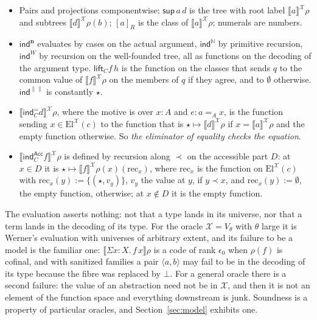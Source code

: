 \documentclass[10pt]{article}
\newcommand{\N}{\mathbb{N}}
\newcommand{\sem}[1]{\llbracket #1\rrbracket}
\newcommand{\El}{\mathrm{El}}
\newcommand{\X}{\mathcal{X}}
\newcommand{\ind}{\mathsf{ind}}
\newcommand{\Acc}{\mathsf{Acc}}
\begin{document}
\begin{definition}[evaluation]
\begin{itemize}
\item Pairs and projections componentwise; $\mathsf{sup}\,a\,d$ is the
  tree with root label $\sem a^\X\rho$ and subtrees $\sem d^\X\rho(b)$;
  $[a]_R$ is the class of $\sem a^\X\rho$; numerals are numbers.
\item $\ind^{\mathbf n}$ evaluates by cases on the actual argument,
  $\ind^\N$ by primitive recursion, $\ind^W$ by recursion on the
  well-founded tree, all as functions on the decoding of the argument
  type. $\mathsf{lift}_Cf\,h$ is the function on the classes that sends
  $q$ to the common value of $\sem f^\X\rho$ on the members of $q$ if
  they agree, and to $\emptyset$ otherwise. $\ind^{\|\|}$ is constantly $\star$.
\item $\sem{\ind^=_Cd}^\X\rho$, where the motive is over $x{:}A$ and
  $e{:}a=_Ax$, is the function sending $x\in\El^\X(c)$ to the function
  that is $\star\mapsto\sem d^\X\rho$ if $x=\sem a^\X\rho$ and the empty
  function otherwise. So \emph{the eliminator of equality checks the
  equation}.
\item $\sem{\ind^{\Acc}_Cf}^\X\rho$ is defined by recursion along $\prec$
  on the accessible part $D$: at $x\in D$ it is
  $\star\mapsto\sem f^\X\rho(x)(\mathrm{rec}_x)$, where $\mathrm{rec}_x$ is
  the function on $\El^\X(c)$ with $\mathrm{rec}_x(y):=\{(\star,v_y)\}$, $v_y$
  the value at $y$, if $y\prec x$, and $\mathrm{rec}_x(y):=\emptyset$, the
  empty function, otherwise; at $x\notin D$ it is the empty function.
\end{itemize}
\end{definition}

\begin{remark}\label{rem:asserts}
The evaluation asserts nothing: not that a type lands in its universe,
nor that a term lands in the decoding of its type. For the oracle
$\X=V_\theta$ with $\theta$ large it is Werner's evaluation with
universes of arbitrary extent, and its failure to be a model is the
familiar one: $\sem{\Sigma x{:}X.\,f\,x}\rho$ is a code of rank
$\epsilon_0$ when $\rho(f)$ is cofinal, and with sanitized families a
pair $\langle a,b\rangle$ may fail to be in the decoding of its type
because the fibre was replaced by $\bot$. For a general oracle there is
a second failure: the value of an abstraction need not be in $\X$, and
then it is not an element of the function space and everything
downstream is junk. Soundness is a property of particular oracles, and
Section~\ref{sec:model} exhibits one.
\end{remark}
\end{document}
